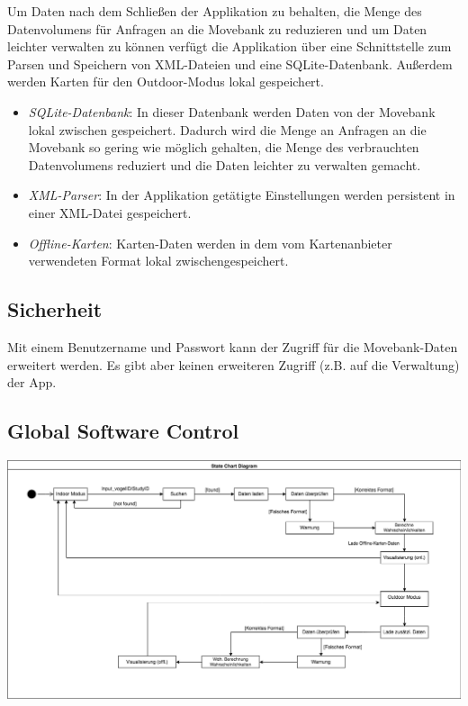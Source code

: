 \documentclass[12pt]{article} %
\begin{document}
Um Daten nach dem Schließen der Applikation zu behalten, die Menge des Datenvolumens für Anfragen an die Movebank zu reduzieren und um Daten leichter verwalten zu können verfügt die Applikation über eine Schnittstelle zum Parsen und Speichern von XML-Dateien und eine SQLite-Datenbank. Außerdem werden Karten für den Outdoor-Modus lokal gespeichert.

\begin{itemize}
	\item \textit{SQLite-Datenbank}: In dieser Datenbank werden Daten von der Movebank lokal zwischen gespeichert. Dadurch wird die Menge an Anfragen an die Movebank so gering wie möglich gehalten, die Menge des verbrauchten Datenvolumens reduziert und die Daten leichter zu verwalten gemacht.
	
	\item \textit{XML-Parser}: In der Applikation getätigte Einstellungen werden persistent in einer XML-Datei gespeichert.
	
	\item \textit{Offline-Karten}: Karten-Daten werden in dem vom Kartenanbieter verwendeten Format lokal zwischengespeichert.
	
	
\end{itemize}



\subsection{Sicherheit}
Mit einem Benutzername und Passwort kann der Zugriff für die Movebank-Daten erweitert werden. Es gibt aber keinen erweiteren Zugriff (z.B. auf die Verwaltung) der App. 


\subsection{Global Software Control}

\includegraphics[width = \textwidth]{Diagramme/state_diagram.png}
\end{document}
